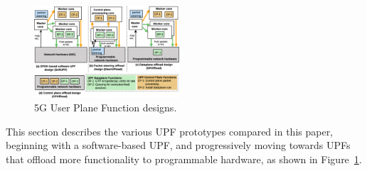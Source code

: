\begin{figure}[t]
 \centering
\includegraphics[width=0.48\textwidth]{fig/all_designs.eps}
 \setlength{\abovecaptionskip}{-5pt}
\setlength{\belowcaptionskip}{-12pt}
 \caption{5G User Plane Function designs.}
 \label{fig:all_designs}
\end{figure}
This section describes the various UPF prototypes compared in this paper, beginning with a software-based UPF, and progressively moving towards UPFs that offload more functionality to programmable hardware, as shown in Figure~\ref{fig:all_designs}.

